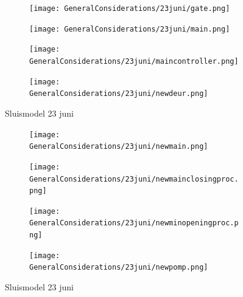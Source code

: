 \documentclass{article}
\begin{document}
	\begin{figure}
		\centering
		\begin{subfigure}{0.45\linewidth}
			\texttt{[image: GeneralConsiderations/23juni/gate.png]}
			\caption{}
			\label{fig:1a}
		\end{subfigure}\hfill
		\begin{subfigure}{0.45\linewidth}
			\texttt{[image: GeneralConsiderations/23juni/main.png]}
			\caption{}
			\label{fig:1a}
		\end{subfigure}
		
		\begin{subfigure}{0.45\linewidth}
			\texttt{[image: GeneralConsiderations/23juni/maincontroller.png]}
			\caption{}
			\label{fig:1a}
		\end{subfigure}\hfill
		\begin{subfigure}{0.45\linewidth}
			\texttt{[image: GeneralConsiderations/23juni/newdeur.png]}
			\caption{}
			\label{fig:1a}
		\end{subfigure}
		\caption{Sluismodel 23 juni}
		\label{fig:1}
	\end{figure}
	
	\begin{figure}
		\centering
		\begin{subfigure}{0.45\linewidth}
			\texttt{[image: GeneralConsiderations/23juni/newmain.png]}
			\caption{}
			\label{fig:1a}
		\end{subfigure}\hfill
		\begin{subfigure}{0.45\linewidth}
			\texttt{[image: GeneralConsiderations/23juni/newmainclosingproc.png]}
			\caption{}
			\label{fig:1a}
		\end{subfigure}
		
		\begin{subfigure}{0.45\linewidth}
			\texttt{[image: GeneralConsiderations/23juni/newminopeningproc.png]}
			\caption{}
			\label{fig:1a}
		\end{subfigure}\hfill
		\begin{subfigure}{0.45\linewidth}
			\texttt{[image: GeneralConsiderations/23juni/newpomp.png]}
			\caption{}
			\label{fig:1a}
		\end{subfigure}
		\caption{Sluismodel 23 juni}
		\label{fig:1}
	\end{figure}
	
\end{document}
